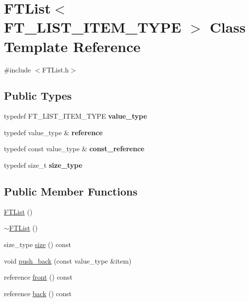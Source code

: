 \hypertarget{class_f_t_list}{}\section{F\+T\+List$<$ F\+T\+\_\+\+L\+I\+S\+T\+\_\+\+I\+T\+E\+M\+\_\+\+T\+Y\+PE $>$ Class Template Reference}
\label{class_f_t_list}


{\ttfamily \#include $<$F\+T\+List.\+h$>$}

\subsection*{Public Types}
\begin{DoxyCompactItemize}
\item 
typedef F\+T\+\_\+\+L\+I\+S\+T\+\_\+\+I\+T\+E\+M\+\_\+\+T\+Y\+PE {\bfseries value\+\_\+type}\hypertarget{class_f_t_list_ae172da3e03bcd6dab4b5f60efe0fc7a3}{}\label{class_f_t_list_ae172da3e03bcd6dab4b5f60efe0fc7a3}

\item 
typedef value\+\_\+type \& {\bfseries reference}\hypertarget{class_f_t_list_a37fe33040a67a2d5aad9ead2bb2179d7}{}\label{class_f_t_list_a37fe33040a67a2d5aad9ead2bb2179d7}

\item 
typedef const value\+\_\+type \& {\bfseries const\+\_\+reference}\hypertarget{class_f_t_list_a82677d676935b1f3cb5e9328523bf3a6}{}\label{class_f_t_list_a82677d676935b1f3cb5e9328523bf3a6}

\item 
typedef size\+\_\+t {\bfseries size\+\_\+type}\hypertarget{class_f_t_list_a5ebe9866c4f86791c6970f19deb09cb1}{}\label{class_f_t_list_a5ebe9866c4f86791c6970f19deb09cb1}

\end{DoxyCompactItemize}
\subsection*{Public Member Functions}
\begin{DoxyCompactItemize}
\item 
\hyperlink{class_f_t_list_a4de727811240b9d8568d1d47fd389502}{F\+T\+List} ()
\item 
\hyperlink{class_f_t_list_aabfac3b136119f727611d490aef3eab4}{$\sim$\+F\+T\+List} ()
\item 
size\+\_\+type \hyperlink{class_f_t_list_a73542705ba9556d5cd594c3ec32fe5d2}{size} () const 
\item 
void \hyperlink{class_f_t_list_acd30af5d1a32185842decac3e0c183ce}{push\+\_\+back} (const value\+\_\+type \&item)
\item 
reference \hyperlink{class_f_t_list_a068805ebb222e9ce69a8828b31fd87df}{front} () const 
\item 
reference \hyperlink{class_f_t_list_ae6b5f56991e9d2ac226ce7960e4661f4}{back} () const 
\end{DoxyCompactItemize}


